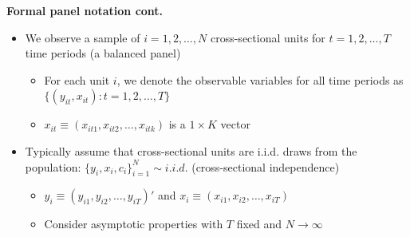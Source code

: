 \documentclass[notes=show]{beamer}
\begin{document}
\begin{frame}[plain]
\begin{center}
\textbf{Formal panel notation cont.}
\end{center}

\begin{itemize}
	\item We observe a sample of $i=1,2,\dots,N$ cross-sectional units for $t=1,2,\dots,T$ time periods (a balanced panel)
		\begin{itemize}
		\item For each unit $i$, we denote the observable variables for all time periods as $\{(y_{it},x_{it}):t=1,2,\dots,T\}$
		\item $x_{it}\equiv(x_{it1},x_{it2}, \dots, x_{itk})$ is a $1\times K$ vector
		\end{itemize}
	\item Typically assume that cross-sectional units are i.i.d. draws from the population: $\{y_i, x_i, c_i\}^N_{i=1}\sim i.i.d.$ (cross-sectional independence)
		\begin{itemize}
		\item $y_i \equiv (y_{i1}, y_{i2}, \dots, y_{iT})'$ and $x_i \equiv (x_{i1},x_{i2}, \dots, x_{iT})$
		\item Consider asymptotic properties with $T$ fixed and $N\rightarrow \infty$
		\end{itemize}
\end{itemize}

\end{frame}
\end{document}
